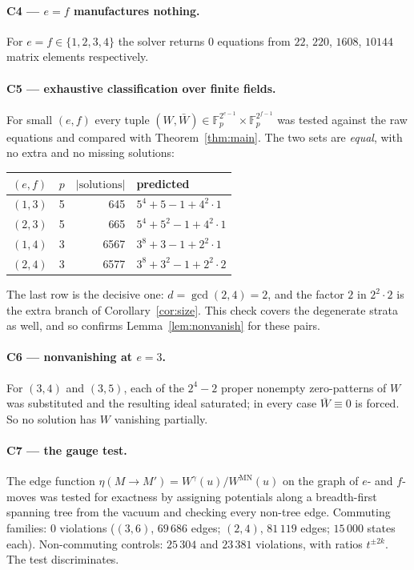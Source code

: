 \documentclass[11pt]{article}
\theoremstyle{definition}
\theoremstyle{remark}
\begin{document}
\paragraph{C4 --- $e=f$ manufactures nothing.}  For $e=f\in\{1,2,3,4\}$ the solver returns
$0$ equations from $22$, $220$, $1608$, $10144$ matrix elements respectively.

\paragraph{C5 --- exhaustive classification over finite fields.}  For small $(e,f)$ every
tuple $(W,\bar W)\in\mathbb F_p^{2^{e-1}}\times\mathbb F_p^{2^{f-1}}$ was tested against
the raw equations and compared with Theorem~\ref{thm:main}.  The two sets are
\emph{equal}, with no extra and no missing solutions:
\begin{center}
\begin{tabular}{lrrl}
$(e,f)$ & $p$ & $|\text{solutions}|$ & predicted\\\hline
$(1,3)$ & 5 & 645  & $5^4+5-1+4^2\cdot1$\\
$(2,3)$ & 5 & 665  & $5^4+5^2-1+4^2\cdot1$\\
$(1,4)$ & 3 & 6567 & $3^8+3-1+2^2\cdot1$\\
$(2,4)$ & 3 & 6577 & $3^8+3^2-1+2^2\cdot2$\\
\end{tabular}
\end{center}
The last row is the decisive one: $d=\gcd(2,4)=2$, and the factor $2$ in
$2^2\cdot2$ is the extra branch of Corollary~\ref{cor:size}.  This check covers the
degenerate strata as well, and so confirms Lemma~\ref{lem:nonvanish} for these pairs.

\paragraph{C6 --- nonvanishing at $e=3$.}  For $(3,4)$ and $(3,5)$, each of the $2^4-2$
proper nonempty zero-patterns of $W$ was substituted and the resulting ideal saturated;
in every case $\bar W\equiv0$ is forced.  So no solution has $W$ vanishing partially.

\paragraph{C7 --- the gauge test.}  The edge function
$\eta(M\to M')=W^{\gamma}(u)/W^{\mathrm{MN}}(u)$ on the graph of $e$- and $f$-moves was
tested for exactness by assigning potentials along a breadth-first spanning tree from the
vacuum and checking every non-tree edge.  Commuting families: $0$ violations
($(3,6)$, $69\,686$ edges; $(2,4)$, $81\,119$ edges; $15\,000$ states each).
Non-commuting controls: $25\,304$ and $23\,381$ violations, with ratios $t^{\pm2k}$.  The
test discriminates.
\end{document}
